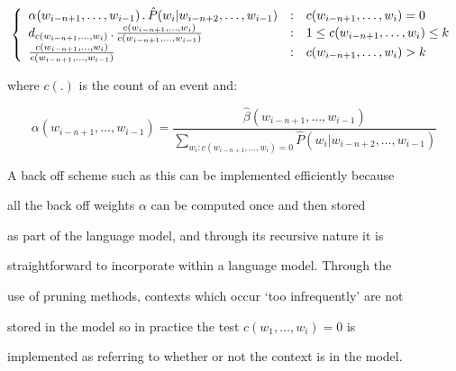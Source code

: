 \vspace{-0.5cm}\begin{equation}


\left\{ \begin{array}{l@{\quad:\quad}l}


\alpha(w_{i-n+1}, \ldots, w_{i-1}) \,.\, \hat{P}(w_i | w_{i-n+2}, \ldots, w_{i-1}) &


c(w_{i-n+1}, \ldots, w_i) = 0\\


d_{c(w_{i-n+1}, \ldots, w_i)} \,.\, \frac{c(w_{i-n+1}, \ldots, w_i)}{c(w_{i-n+1},


\ldots, w_{i-1})} & 1 \le c(w_{i-n+1}, \ldots, w_i) \le k\\


\frac{c(w_{i-n+1}, \ldots, w_i)}{c(w_{i-n+1},


\ldots, w_{i-1})} & c(w_{i-n+1}, \ldots, w_i) > k\\


\end{array}\right.


\end{equation}


where $c(.)$ is the count of an event and:


\begin{equation}


\alpha(w_{i-n+1}, \ldots, w_{i-1}) = \frac{\hat{\beta}(w_{i-n+1},


\ldots, w_{i-1})} {\sum_{w_i: c(w_{i-n+1}, \ldots, w_i)=0}\hat{P}(w_i


| w_{i-n+2}, \ldots, w_{i-1})}


\end{equation}


A back off scheme such as this can be implemented efficiently because


all the back off weights $\alpha$ can be computed once and then stored


as part of the language model, and through its recursive nature it is


straightforward to incorporate within a language model.  Through the


use of pruning methods, contexts which occur `too infrequently' are not


stored in the model so in practice the test $c(w_1,\ldots,w_{i})=0$ is


implemented as referring to whether or not the context is in the model.






